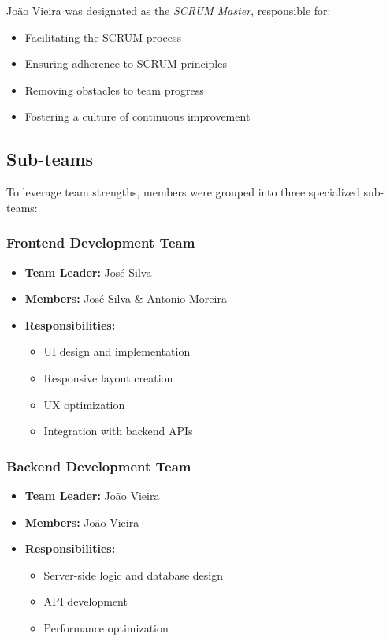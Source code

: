 João Vieira was designated as the \textit{SCRUM Master}, responsible for:

\begin{itemize}
    \item Facilitating the SCRUM process
    \item Ensuring adherence to SCRUM principles
    \item Removing obstacles to team progress
    \item Fostering a culture of continuous improvement
\end{itemize}

\subsection{Sub-teams}
\label{subsec:sub_teams}

To leverage team strengths, members were grouped into three specialized sub-teams:

\subsubsection{Frontend Development Team}
\begin{itemize}
    \item \textbf{Team Leader:} José Silva 
    \item \textbf{Members:} José Silva \& Antonio Moreira
    \item \textbf{Responsibilities:}
    \begin{itemize}
        \item UI design and implementation
        \item Responsive layout creation
        \item UX optimization
        \item Integration with backend APIs
    \end{itemize}
\end{itemize}

\subsubsection{Backend Development Team}
\begin{itemize}
    \item \textbf{Team Leader:} João Vieira 
    \item \textbf{Members:} João Vieira
    \item \textbf{Responsibilities:}
    \begin{itemize}
        \item Server-side logic and database design
        \item API development
        \item Performance optimization
    \end{itemize}
\end{itemize}

